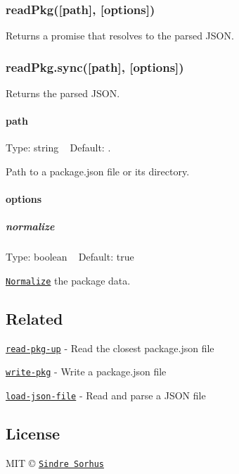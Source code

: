 \subsubsection*{read\+Pkg(\mbox{[}path\mbox{]}, \mbox{[}options\mbox{]})}

Returns a promise that resolves to the parsed J\+S\+ON.

\subsubsection*{read\+Pkg.\+sync(\mbox{[}path\mbox{]}, \mbox{[}options\mbox{]})}

Returns the parsed J\+S\+ON.

\paragraph*{path}

Type\+: {\ttfamily string} ~\newline
Default\+: {\ttfamily .}

Path to a {\ttfamily package.\+json} file or its directory.

\paragraph*{options}

\subparagraph*{normalize}

Type\+: {\ttfamily boolean} ~\newline
Default\+: {\ttfamily true}

\href{https://github.com/npm/normalize-package-data#what-normalization-currently-entails}{\tt Normalize} the package data.

\subsection*{Related}


\begin{DoxyItemize}
\item \href{https://github.com/sindresorhus/read-pkg-up}{\tt read-\/pkg-\/up} -\/ Read the closest package.\+json file
\item \href{https://github.com/sindresorhus/write-pkg}{\tt write-\/pkg} -\/ Write a {\ttfamily package.\+json} file
\item \href{https://github.com/sindresorhus/load-json-file}{\tt load-\/json-\/file} -\/ Read and parse a J\+S\+ON file
\end{DoxyItemize}

\subsection*{License}

M\+IT © \href{http://sindresorhus.com}{\tt Sindre Sorhus} 